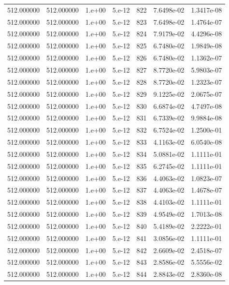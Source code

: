 \begin{table}[htbp]
\begin{tabular}{rrrrrrr}
512.000000 & 512.000000 & 1.e+00 & 5.e-12 & 822 & 7.6498e-02 & 1.3417e-08 \\
512.000000 & 512.000000 & 1.e+00 & 5.e-12 & 823 & 7.6498e-02 & 1.4764e-07 \\
512.000000 & 512.000000 & 1.e+00 & 5.e-12 & 824 & 7.9179e-02 & 4.4296e-08 \\
512.000000 & 512.000000 & 1.e+00 & 5.e-12 & 825 & 6.7480e-02 & 1.9849e-08 \\
512.000000 & 512.000000 & 1.e+00 & 5.e-12 & 826 & 6.7480e-02 & 1.1362e-07 \\
512.000000 & 512.000000 & 1.e+00 & 5.e-12 & 827 & 8.7720e-02 & 5.9803e-07 \\
512.000000 & 512.000000 & 1.e+00 & 5.e-12 & 828 & 8.7720e-02 & 1.2323e-07 \\
512.000000 & 512.000000 & 1.e+00 & 5.e-12 & 829 & 9.1225e-02 & 2.0675e-07 \\
512.000000 & 512.000000 & 1.e+00 & 5.e-12 & 830 & 6.6874e-02 & 4.7497e-08 \\
512.000000 & 512.000000 & 1.e+00 & 5.e-12 & 831 & 6.7339e-02 & 9.9884e-08 \\
512.000000 & 512.000000 & 1.e+00 & 5.e-12 & 832 & 6.7524e-02 & 1.2500e-01 \\
512.000000 & 512.000000 & 1.e+00 & 5.e-12 & 833 & 4.1163e-02 & 6.0540e-08 \\
512.000000 & 512.000000 & 1.e+00 & 5.e-12 & 834 & 5.0881e-02 & 1.1111e-01 \\
512.000000 & 512.000000 & 1.e+00 & 5.e-12 & 835 & 6.2745e-02 & 1.1111e-01 \\
512.000000 & 512.000000 & 1.e+00 & 5.e-12 & 836 & 4.4063e-02 & 1.0823e-07 \\
512.000000 & 512.000000 & 1.e+00 & 5.e-12 & 837 & 4.4063e-02 & 1.4678e-07 \\
512.000000 & 512.000000 & 1.e+00 & 5.e-12 & 838 & 4.4103e-02 & 1.1111e-01 \\
512.000000 & 512.000000 & 1.e+00 & 5.e-12 & 839 & 4.9549e-02 & 1.7013e-08 \\
512.000000 & 512.000000 & 1.e+00 & 5.e-12 & 840 & 5.4189e-02 & 2.2222e-01 \\
512.000000 & 512.000000 & 1.e+00 & 5.e-12 & 841 & 3.0856e-02 & 1.1111e-01 \\
512.000000 & 512.000000 & 1.e+00 & 5.e-12 & 842 & 2.6609e-02 & 2.4518e-07 \\
512.000000 & 512.000000 & 1.e+00 & 5.e-12 & 843 & 2.8586e-02 & 5.5556e-02 \\
512.000000 & 512.000000 & 1.e+00 & 5.e-12 & 844 & 2.8843e-02 & 2.8360e-08 \\

\end{tabular}
\end{table}
